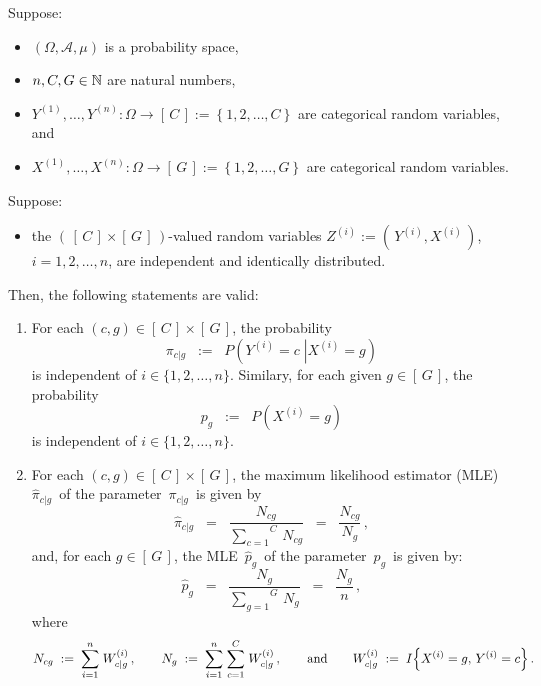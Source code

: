 \begin{proposition}
\mbox{}\vskip 0.1cm\noindent
Suppose:
\begin{itemize}
\item
	$\left(\Omega,\mathcal{A},\mu\right)$ is a probability space,
\item
	$n, C, G \in \mathbb{N}$ are natural numbers,
\item
	$Y^{(1)}, \ldots, Y^{(n)} : \Omega \longrightarrow \left[\,C\,\right] := \left\{1,2,\ldots,C\right\}$
	are categorical random variables, and
\item
	$X^{(1)}, \ldots, X^{(n)} : \Omega \longrightarrow \left[\,G\,\right] := \left\{1,2,\ldots,G\right\}$
	are categorical random variables.
\end{itemize}
Suppose:
\begin{itemize}
\item
	the $\left(\,\left[\,C\,\right] \times \left[\,G\,\right]\,\right)$-valued random variables
	$Z^{(i)} := \left(\,Y^{(i)},X^{(i)}\,\right)$, $i = 1, 2, \ldots, n$,
	are independent and identically distributed.
\end{itemize}
Then, the following statements are valid:
\begin{enumerate}
\item
	\label{independenceOfI}
	For each $(c,g) \in \left[\,C\,\right] \times \left[\,G\,\right]$, the probability
	\begin{equation*}
	\pi_{c \vert g} \;\;:=\;\; P\!\left(\left.Y^{(i)} = c \;\right\vert X^{(i)} = g\right)
	\end{equation*}
	is independent of $i \in \{1,2,\ldots,n\}$.
	Similary, for each given $g \in \left[\,G\,\right]$, the probability
	\begin{equation*}
	p_{g} \;\; := \;\; P\!\left(X^{(i)} = g\right)
	\end{equation*}
	is independent of $i \in \{1,2,\ldots,n\}$.
\item
	For each $(c,g) \in \left[\,C\,\right] \times \left[\,G\,\right]$,
	the maximum likelihood estimator (MLE)
	\,$\widehat{\pi}_{c\vert g}$\,
	of the parameter
	\,$\pi_{c\vert g}$\,
	is given by
	\begin{equation*}
	\widehat{\pi}_{c\vert g}
	\;\; = \;\;
		\dfrac{N_{cg}}{\overset{C}{\underset{c=1}{\sum}}\,N_{cg}}
	\;\; = \;\;
		\dfrac{N_{cg}}{N_{g}}\,,
	\end{equation*}	
	and, for each $g \in \left[\,G\,\right]$,
	the MLE
	\,$\widehat{p}_{g}$\,
	of the parameter
	\,$p_{g}$\,
	is given by:
	\begin{equation*}
	\widehat{p}_{g}
	\;\; = \;\;
		\dfrac{N_{g}}{\overset{G}{\underset{g=1}{\sum}}\,N_{g}}
	\;\; = \;\;
		\dfrac{N_{g}}{n}\,,
	\end{equation*}
	where
	\begin{equation*}
	N_{cg}
		\; := \;
		\overset{n}{\underset{i=1}{\sum}}\;
		W^{(i)}_{c \vert g}\,,
	\quad\quad
	N_{g}
		\; := \;
		\overset{n}{\underset{i=1}{\sum}} \;
		\overset{C}{\underset{c=1}{\sum}} \;
		W^{(i)}_{c \vert g}\,,
	\quad\quad
	\textnormal{and}
	\quad\quad
	W^{(i)}_{c \vert g}
		\; := \;
		I\!\left\{X^{(i)}=g,\,Y^{(i)}=c\right\}.
	\end{equation*}
\end{enumerate}
\end{proposition}

